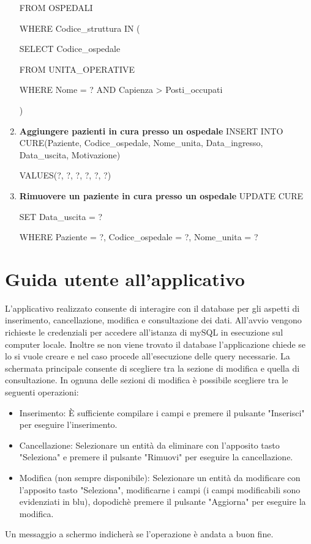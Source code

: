 \documentclass[a4paper,12pt]{report}
\begin{document}
\begin{enumerate}[leftmargin=0cm,itemindent=.5cm,labelwidth=\itemindent,labelsep=0cm,align=left]
    FROM OSPEDALI
    
    WHERE Codice\_struttura IN (
    
        SELECT Codice\_ospedale
        
        FROM UNITA\_OPERATIVE
        
        WHERE Nome = ? AND Capienza > Posti\_occupati
    
    )

    \item \textbf{Aggiungere pazienti in cura presso un ospedale} \newline
    INSERT INTO CURE(Paziente, Codice\_ospedale, Nome\_unita, Data\_ingresso, Data\_uscita, Motivazione)
    
    VALUES(?, ?, ?, ?, ?, ?)

    \item \textbf{Rimuovere un paziente in cura presso un ospedale} \newline
    UPDATE CURE

    SET Data\_uscita = ?

    WHERE Paziente = ?, Codice\_ospedale = ?, Nome\_unita = ?

\end{enumerate}

\chapter{Guida utente all'applicativo}

L'applicativo realizzato consente di interagire con il database per gli aspetti di inserimento, cancellazione, modifica e consultazione dei dati.
All'avvio vengono richieste le credenziali per accedere all'istanza di mySQL in esecuzione sul computer locale. Inoltre se non viene trovato il database l'applicazione chiede se lo si 
vuole creare e nel caso procede all'esecuzione delle query necessarie.
La schermata principale consente di scegliere tra la sezione di modifica e quella di consultazione.
In ognuna delle sezioni di modifica è possibile scegliere tra le seguenti operazioni:
\begin{itemize}
    \item Inserimento: È sufficiente compilare i campi e premere il pulsante "Inserisci" per eseguire l'inserimento.
    \item Cancellazione: Selezionare un entità da eliminare con l'apposito tasto "Seleziona" e premere il pulsante "Rimuovi" per eseguire la cancellazione.
    \item Modifica (non sempre disponibile): Selezionare un entità da modificare con l'apposito tasto "Seleziona", modificarne i campi (i campi modificabili sono evidenziati in blu),
    dopodichè premere il pulsante "Aggiorna" per eseguire la modifica.
\end{itemize}
Un messaggio a schermo indicherà se l'operazione è andata a buon fine.
\end{document}
